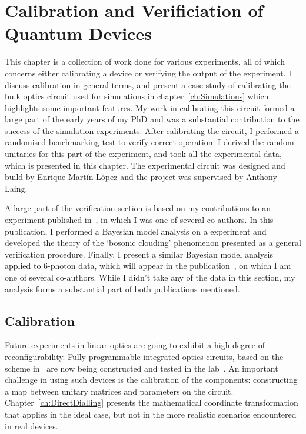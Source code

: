 \chapter{Calibration and Verificiation of Quantum Devices}
\label{ch:QCV}
This chapter is a collection of work done for various experiments, all of which
concerns either calibrating a device or verifying the output of the experiment.
I discuss calibration in general terms, and present a case study of calibrating
the bulk optics circuit used for simulations in chapter~\ref{ch:Simulations}
which highlights some important features. My work in calibrating this circuit
formed a large part of the early years of my PhD and was a substantial
contribution to the success of the simulation experiments. After calibrating the
circuit, I performed a randomised benchmarking test to verify correct operation.
I derived the random unitaries for this part of the experiment, and took all
the experimental data, which is presented in this chapter. The experimental
circuit was designed and build by Enrique Mart\'in L\'opez and the project was
supervised by Anthony Laing.

A large part of the verification section is based on my contributions to an
experiment published in~\cite{verification}, in which I was one of several
co-authors. In this publication, I performed a Bayesian model analysis on a
\bosonsampling{} experiment and developed the theory of the `bosonic clouding'
phenomenon presented as a general verification procedure. Finally, I present a
similar Bayesian model analysis applied to 6-photon data, which will appear in
the publication~\cite{bigreck}, on which I am one of several co-authors. While I
didn't take any of the data in this section, my analysis forms a substantial
part of both publications mentioned.

\section{Calibration}
\label{sec:Calibration}
Future experiments in linear optics are going to exhibit a high degree of
reconfigurability. Fully programmable integrated optics circuits, based on the
scheme in~\cite{reck} are now being constructed and tested in the
lab~\cite{bigreck, qpp}. An important challenge in using such devices is the
calibration of the components: constructing a map between unitary matrices and
parameters on the circuit. Chapter~\ref{ch:DirectDialling} presents the
mathematical coordinate transformation that applies in the ideal case, but not
in the more realistic scenarios encountered in real devices.

